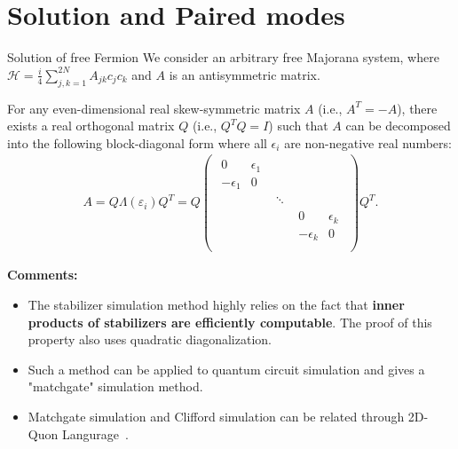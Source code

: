 \documentclass{beamer}
\begin{document}
\section{Solution and Paired modes}
\begin{frame}[allowframebreaks]{Solution of free Fermion}
We consider an arbitrary free Majorana system, where $\mathcal{H} =  \frac{i}{4}\sum_{j,k = 1}^{2N}A_{jk}c_jc_k$ and $A$ is an antisymmetric matrix. 
\begin{lemma}
\label{lemma:diag}
For any even-dimensional real skew-symmetric matrix $A$ (i.e., $A^T = -A$), there exists a real orthogonal matrix $Q$ (i.e., $Q^T Q = I$) such that $A$ can be decomposed into the following block-diagonal form where all $\epsilon_i$ are non-negative real numbers:
\begin{align}
    A = Q\Lambda(\varepsilon_i) Q^T = Q
\begin{pmatrix}
\begin{matrix} 0 & \epsilon_1 \\ -\epsilon_1 & 0 \end{matrix} & &  \\
& \ddots & \\
 & & \begin{matrix} 0 & \epsilon_k \\ -\epsilon_k & 0 \end{matrix} \\
\end{pmatrix}
Q^T.
\end{align}
\end{lemma}
\newpage
\textbf{Comments:}\\
\begin{itemize}
    \item The stabilizer simulation method highly relies on the fact that \textbf{inner products of stabilizers are efficiently computable}. The proof of this property also uses quadratic diagonalization.
    \item Such a method can be applied to quantum circuit simulation and gives a  "matchgate" simulation method.
    \item Matchgate simulation and Clifford simulation can be related through 2D-Quon Langurage~\cite{kang20252dquonlanguageunifying}.
\end{itemize}
\end{frame}
\end{document}

